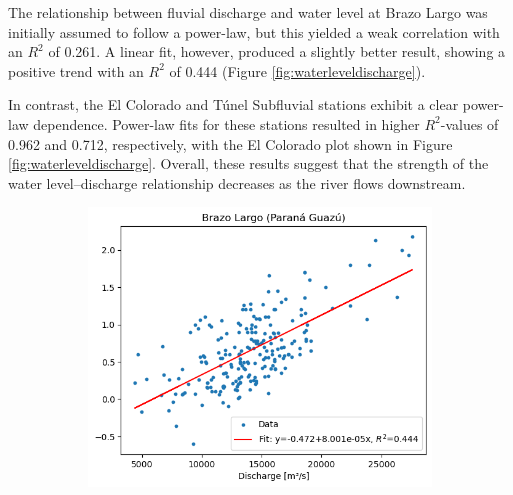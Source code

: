 The relationship between fluvial discharge and water level at Brazo Largo was initially assumed to follow a power-law, but this yielded a weak correlation with an $R^2$ of 0.261. A linear fit, however, produced a slightly better result, showing a positive trend with an $R^2$ of 0.444 (Figure \ref{fig:waterleveldischarge}).

In contrast, the El Colorado and Túnel Subfluvial stations exhibit a clear power-law dependence. Power-law fits for these stations resulted in higher $R^2$-values of 0.962 and 0.712, respectively, with the El Colorado plot shown in Figure \ref{fig:waterleveldischarge}. Overall, these results suggest that the strength of the water level–discharge relationship decreases as the river flows downstream.

\begin{figure}[h!]
    \centering
    \begin{subfigure}[b]{0.48\linewidth}
        \centering
        \includegraphics[width=\linewidth]{figures/ch5/wl discharge Brazo Largo.png}
        \label{fig:water level discharge Brazo Largo}
    \hfill
    \end{subfigure}
    \begin{subfigure}[b]{0.48\linewidth}
        \centering

\end{subfigure}
\end{figure}
